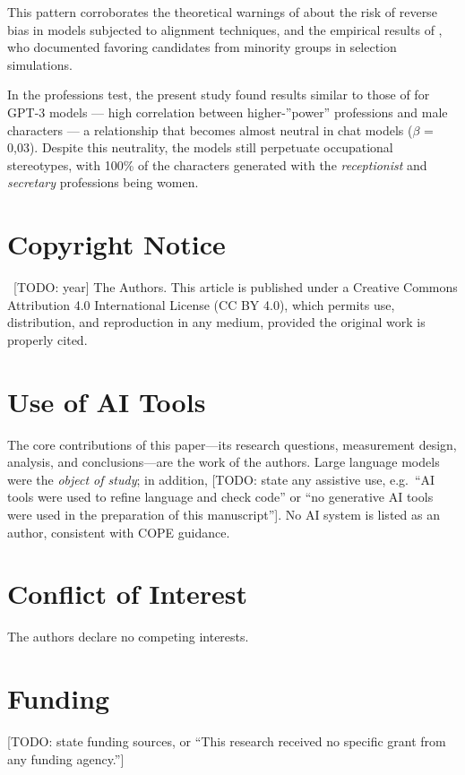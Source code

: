 \documentclass[jair,11pt,letterpaper]{article}
\begin{document}
This pattern corroborates the theoretical warnings of  about the
risk of reverse bias in models subjected to alignment techniques, and
the empirical results of , who documented
favoring candidates from minority groups in selection
simulations.

In the professions test, the present study found results similar
to those of  for GPT-3 models --- high correlation between
higher-''power'' professions and male characters --- a relationship that
becomes almost neutral in chat models ($\beta$ = 0,03). Despite this
neutrality, the models still perpetuate occupational stereotypes, with
100\% of the characters generated with the \textit{receptionist} and
\textit{secretary} professions being women.





\newpage

\section*{Copyright Notice}
\textcopyright~[TODO: year] The Authors. This article is published under a
Creative Commons Attribution 4.0 International License (CC BY 4.0), which permits
use, distribution, and reproduction in any medium, provided the original work is
properly cited.

\section*{Use of AI Tools}
The core contributions of this paper---its research questions, measurement
design, analysis, and conclusions---are the work of the authors. Large language
models were the \emph{object of study}; in addition, [TODO: state any assistive
use, e.g.\ ``AI tools were used to refine language and check code'' or ``no
generative AI tools were used in the preparation of this manuscript'']. No AI
system is listed as an author, consistent with COPE guidance.

\section*{Conflict of Interest}
The authors declare no competing interests. %

\section*{Funding}
[TODO: state funding sources, or ``This research received no specific grant from
any funding agency.'']
\end{document}
